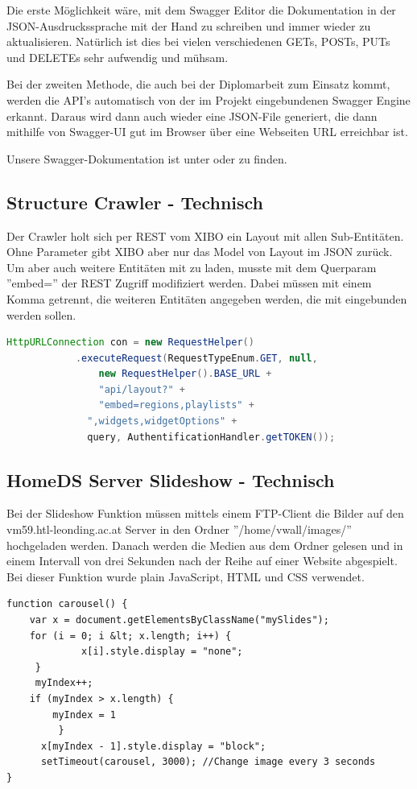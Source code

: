 Die erste Möglichkeit wäre, mit dem Swagger Editor die Dokumentation in der JSON-Ausdruckssprache mit der Hand zu schreiben und immer wieder zu aktualisieren. Natürlich ist dies bei vielen verschiedenen GETs, POSTs, PUTs und DELETEs sehr aufwendig und mühsam.

Bei der zweiten Methode, die auch bei der Diplomarbeit zum Einsatz kommt, werden die API's automatisch von der im Projekt eingebundenen Swagger Engine erkannt. Daraus wird dann auch wieder eine JSON-File generiert, die dann mithilfe von Swagger-UI gut im Browser über eine Webseiten URL erreichbar ist.

Unsere Swagger-Dokumentation ist unter   oder  zu finden. \cite{swagger}

\subsection{Structure Crawler - Technisch}\label{sec:structurecrawlertechnical}
Der Crawler holt sich per REST vom XIBO ein Layout mit allen Sub-Entitäten. Ohne Parameter gibt XIBO aber nur das Model von Layout im JSON zurück. Um aber auch weitere Entitäten mit zu laden, musste mit dem Querparam  ''embed='' der REST Zugriff modifiziert werden. Dabei müssen mit einem Komma getrennt, die weiteren Entitäten angegeben werden, die mit eingebunden werden sollen.

\begin{lstlisting}[language=Java, caption={Crawler GET Request}]
HttpURLConnection con = new RequestHelper()
         	.executeRequest(RequestTypeEnum.GET, null,
             	new RequestHelper().BASE_URL + 
             	"api/layout?" + 
             	"embed=regions,playlists" + 
              ",widgets,widgetOptions" + 
              query, AuthentificationHandler.getTOKEN());
\end{lstlisting}

\subsection{HomeDS Server Slideshow - Technisch}\label{sec:slideshowtechnical}
Bei der Slideshow Funktion müssen mittels einem FTP-Client die Bilder auf den vm59.htl-leonding.ac.at Server in den Ordner ''/home/vwall/images/'' hochgeladen werden. Danach werden die Medien aus dem Ordner gelesen und in einem Intervall von drei Sekunden nach der Reihe auf einer Website abgespielt. Bei dieser Funktion wurde plain JavaScript, HTML und CSS verwendet.

\begin{lstlisting}[caption={Carousel JavaScript}]
function carousel() {
    var x = document.getElementsByClassName("mySlides");
    for (i = 0; i &lt; x.length; i++) {
    		 x[i].style.display = "none";
  	 }
     myIndex++;
   	if (myIndex > x.length) {
   		myIndex = 1
    	 }
      x[myIndex - 1].style.display = "block";
      setTimeout(carousel, 3000); //Change image every 3 seconds
}
\end{lstlisting}
